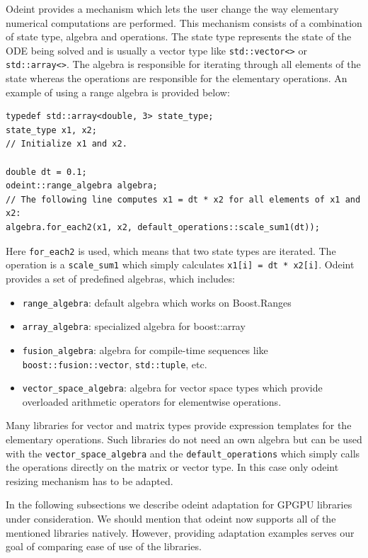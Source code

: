 \documentclass[1p]{elsarticle}
\newcommand{\code}[1]{\lstinline|#1|}
\begin{document}
Odeint provides a mechanism which lets the user change the way 
elementary numerical computations are performed. This mechanism consists of a
combination of state type, algebra and operations. The state type represents the
state of the ODE being solved and is usually a vector type like
\code{std::vector<>} or \code{std::array<>}. The algebra is responsible for
iterating through all elements of the state whereas the operations are
responsible for the elementary operations. An example of using a range algebra
is provided below:
\begin{lstlisting}
typedef std::array<double, 3> state_type;
state_type x1, x2;
// Initialize x1 and x2.

double dt = 0.1;
odeint::range_algebra algebra;
// The following line computes x1 = dt * x2 for all elements of x1 and x2:
algebra.for_each2(x1, x2, default_operations::scale_sum1(dt));
\end{lstlisting}
Here \code{for_each2} is used, which means that
two state types are iterated. The operation is a \code{scale_sum1} which simply
calculates \code{x1[i] = dt * x2[i]}. Odeint provides a set of predefined
algebras, which includes:
\begin{itemize}
    \item \code{range_algebra}: default algebra which works on Boost.Ranges
    \item \code{array_algebra}: specialized algebra for boost::array
    \item \code{fusion_algebra}: algebra for compile-time sequences like
        \code{boost::fusion::vector}, \code{std::tuple}, etc.
    \item \code{vector_space_algebra}: algebra for vector space types which
        provide overloaded arithmetic operators for elementwise operations.
\end{itemize}


Many libraries for vector and matrix types provide expression templates for the
elementary operations. Such libraries do not need an own algebra but can be
used with the \code{vector_space_algebra} and the \code{default_operations}
which simply calls the operations directly on the matrix or vector type. In
this case only odeint resizing mechanism has to be adapted.

In the following subsections we describe odeint adaptation for GPGPU libraries
under consideration. We should mention that odeint now supports all of the
mentioned libraries natively. However, providing adaptation examples serves our
goal of comparing ease of use of the libraries.
\end{document}
